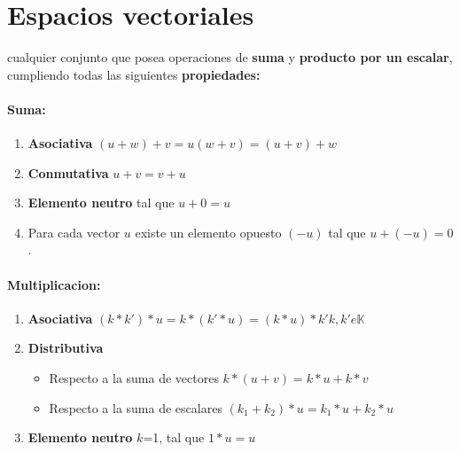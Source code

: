 \documentclass[10pt]{article}
\begin{document}
 
\maketitle

\section{Espacios vectoriales}

cualquier conjunto que posea operaciones de \textbf{suma} y 
\textbf{producto por un escalar}, cumpliendo todas las siguientes \textbf{propiedades:}\\
\linebreak
\paragraph{Suma: }

\begin{enumerate}
    \item \textbf{Asociativa} $(u+w) + v = u (w+v) = (u+v) + w$
    \item \textbf{Conmutativa} $u + v = v + u $
    \item \textbf{Elemento neutro} tal que $u + 0 = u$ 
    \item Para cada vector $u$ existe un elemento opuesto $(-u)$ tal que $u+(-u)=0$.
    
\end{enumerate}

\paragraph{Multiplicacion: }

\begin{enumerate}
    \item \textbf{Asociativa} $(k*k')*u=k*(k'*u)=(k*u)*k'  k,k' e \mathbb{K}$
    \item \textbf{Distributiva}
    \begin{itemize}
        \item Respecto a la suma de vectores  $k*(u+v) = k*u+k*v$
        \item Respecto a la suma de escalares  $(k_1+k_2) *u = k_1*u + k_2 *u$   
    
    \end{itemize}
    \item \textbf{Elemento neutro} $k$=1, tal que $1*u = u$
    
\end{enumerate}
\end{document}
